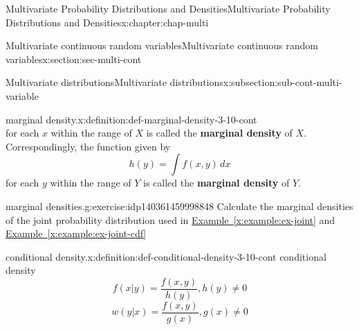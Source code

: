 \documentclass[oneside,10pt,]{book}
\newcommand{\xreffont}{\relax}
\newcommand{\terminology}[1]{\textbf{#1}}
\numberwithin{equation}{section}
\begin{document}
\begin{chapterptx}{Multivariate Probability Distributions and Densities}{}{Multivariate Probability Distributions and Densities}{}{}{x:chapter:chap-multi}
\begin{sectionptx}{Multivariate continuous random variables}{}{Multivariate continuous random variables}{}{}{x:section:sec-multi-cont}
\begin{subsectionptx}{Multivariate distributions}{}{Multivariate distributions}{}{}{x:subsection:sub-cont-multi-variable}
\begin{definition}{marginal density.}{x:definition:def-marginal-density-3-10-cont}
\begin{equation*}
\end{equation*}
for each \(x\) within the range of \(X\) is called the \terminology{marginal density} of \(X\). Correspondingly, the function given by%
\begin{equation*}
h(y) = \int f(x, y)\,dx
\end{equation*}
for each \(y\) within the range of \(Y\) is called the \terminology{marginal density} of \(Y\).%
\end{definition}
\begin{inlineexercise}{marginal densities.}{g:exercise:idp140361459998848}%
Calculate the marginal densities of the joint probability distribution used in \hyperref[x:example:ex-joint]{Example~{\xreffont\ref{x:example:ex-joint}}} and \hyperref[x:example:ex-joint-cdf]{Example~{\xreffont\ref{x:example:ex-joint-cdf}}}%
\end{inlineexercise}
\begin{definition}{conditional density.}{x:definition:def-conditional-density-3-10-cont}%
conditional density%
\begin{equation*}
f(x|y) = \dfrac{f(x, y)}{h(y)}, h(y)\ne 0
\end{equation*}
%
\begin{equation*}
w(y|x) = \dfrac{f(x, y)}{g(x)}, g(x)\ne 0
\end{equation*}
%
\end{definition}
\end{subsectionptx}
%
%
\typeout{************************************************}
\typeout{************************************************}
%
\end{sectionptx}
\end{chapterptx}
\end{document}
